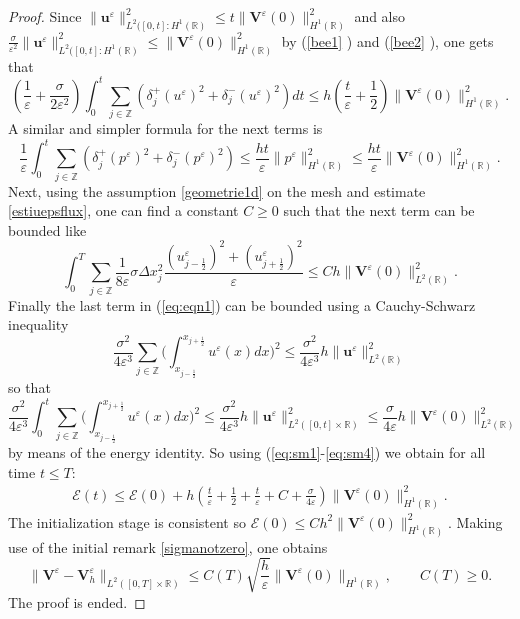 \documentclass[a4paper,french,english,10pt]{article}
\newcommand\eps{\varepsilon}
\newcommand\V{\mathbf{V}}
\begin{document}
\begin{proof}
Since $\| \mathbf u^\eps  \|^2_{ L^2( [0,t] : H^1(\mathbb R) }\leq t \| \V^{\eps}(0) \|_{H^1(\mathbb{R})}^2$ and also 
$
\frac{\sigma}
{\eps^2}\| \mathbf u^\eps  \|^2_{ L^2( [0,t] : H^1(\mathbb R) }\leq  \| \V^{\eps}(0) \|_{H^1(\mathbb{R})}^2$
by (\ref{bee1} ) and (\ref{bee2} ), one gets that
\begin{equation} \label{eq:sm1}
\left( \frac{1}{\eps}+\frac{\sigma}{2\eps^2}\right)
\int_0^t 
\sum_{j\in \mathbb{Z}} 
\left ( 
\delta_{j}^+(u^{\eps})^2+\delta_{j}^-(u^{\eps})^2\right )dt
\leq  h  \left( \frac{t}\eps+\frac{1}{2}\right)
\| \V^{\eps}(0) \|_{H^1(\mathbb{R})}^2.
\end{equation}
A similar and simpler formula for the next terms is
\begin{equation} \label{eq:sm2}
 \frac{1}{\eps}\int_0^t 
 \sum_{j\in \mathbb{Z}} 
 \left (
\delta_{j}^+(p^{\eps})^2+\delta_{j}^-(p^{\eps}
)^2\right ) \leq   \frac{ h t}\eps 
\|  p^\eps  \|^2_{  H^1(\mathbb R) }
\leq     \frac{ h t}\eps 
\| \V^{\eps}(0) \|_{H^1(\mathbb{R})}^2.
\end{equation}
Next, using the assumption \eqref{geometrie1d} on the mesh and estimate \eqref{estiuepsflux}, one can find a constant $C\geq0$ such that the next term can be  bounded like 
\begin{equation} \label{eq:sm3}
 \int_0^T \underset{j\in \mathbb{Z}}{\sum} \frac{1}{8\eps} \sigma \Delta x_j^2
\frac{(u_{j-\frac12 }^{\eps})^2+(
u_{j+\frac12 }^{\eps})^2}{\eps} \leq C h \|\mathbf{V}^{\eps}(0)\|_{L^2(\mathbb{R})}^2.
\end{equation}
Finally the last term in (\ref{eq:eqn1}) can be bounded using a
Cauchy-Schwarz inequality 
$$
\frac{\sigma^2}{4\eps^3} \sum_{j\in
\mathbb{Z}}\bigg( {\int_{x_{j-\frac12}}^{x_{j+\frac12}}} u^{\eps}(x) dx \bigg)^2
\leq 
\frac{\sigma^2}{4\eps^3}
h \|  \mathbf u^\eps  \|^2_{  L^2(\mathbb R) }
$$
so that
\begin{equation} \label{eq:sm4}
\frac{\sigma^2}{4\eps^3} 
\int_0^t 
 \sum_{j\in
\mathbb{Z}}\bigg( {\int_{x_{j-\frac12}}^{x_{j+\frac12}}} u^{\eps}(x) dx \bigg)^2
\leq 
\frac{\sigma^2}{4\eps^3}
h \|  \mathbf u^\eps  \|^2_{  L^2([0,t]\times \mathbb R) }
\leq 
\frac{\sigma}{4\eps}
h  \|\mathbf{V}^{\eps}(0)\|_{L^2(\mathbb{R})}^2
\end{equation}
by means of the energy identity.
 So using (\ref{eq:sm1}-\ref{eq:sm4}) we obtain for all time $t\leq T$:
\begin{eqnarray*}
\mathscr{E}(t) \leq
\mathscr{E}(0)+h
\left( \frac{t}{\eps}+\frac{1}2 + \frac{t}{\eps}+C+\frac{\sigma
}{4\eps}\right)\| \V^{\eps}(0) \|_{H^1(\mathbb{R})}^2.
\end{eqnarray*}
The initialization stage is consistent so 
 $\mathscr{E}(0)\leq Ch^2\| \V^{\eps}(0) \|_{H^1(\mathbb{R})}^2$.
 Making use of the  initial remark \ref{sigmanotzero}, one   obtains 
\begin{equation*}\label{esti1}
\|\V^{\eps}-\V^{\eps}_h \|_{L^2([0,T]\times \mathbb{R})}
\leq C(T) \sqrt{ \frac{h}{\eps}}
\| \V^{\eps}( 0)
\|_{H^1(\mathbb{R})}, \qquad C(T)\geq0.
\end{equation*}
The proof is ended.
\end{proof}
\end{document}
